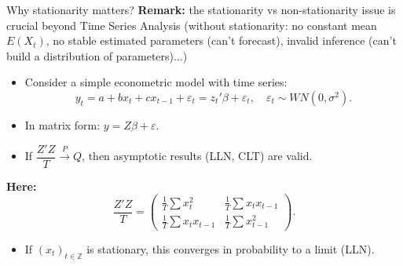 \documentclass{beamer}
\begin{document}

\begin{frame}{Why stationarity matters?}
\small
\textbf{Remark:} the stationarity vs non-stationarity issue is crucial beyond Time Series Analysis (without stationarity: no constant mean $E(X_t)$, no stable estimated parameters (can't forecast), invalid inference (can't build a distribution of parameters)...)

\begin{itemize}
    \item Consider a simple econometric model with time series:
    \[
    y_t = a + b x_t + c x_{t-1} + \varepsilon_t = z_t' \beta + \varepsilon_t,
    \quad \varepsilon_t \sim WN(0, \sigma^2).
    \]
    \item In matrix form: \quad $y = Z\beta + \varepsilon$.
    \item If $\dfrac{Z'Z}{T} \xrightarrow{P} Q$, then asymptotic results (LLN, CLT) are valid.
\end{itemize}

\vspace{0.2cm}
\textbf{Here:}
\[
\frac{Z'Z}{T} =
\begin{pmatrix}
\frac{1}{T}\sum x_t^2 & \frac{1}{T}\sum x_t x_{t-1} \\
\frac{1}{T}\sum x_t x_{t-1} & \frac{1}{T}\sum x_{t-1}^2
\end{pmatrix}.
\]

\begin{itemize}
    \item If $(x_t)_{t \in \mathbb{Z}}$ is stationary, this converges in probability to a limit (LLN).
\end{itemize}
\end{frame}
\end{document}
